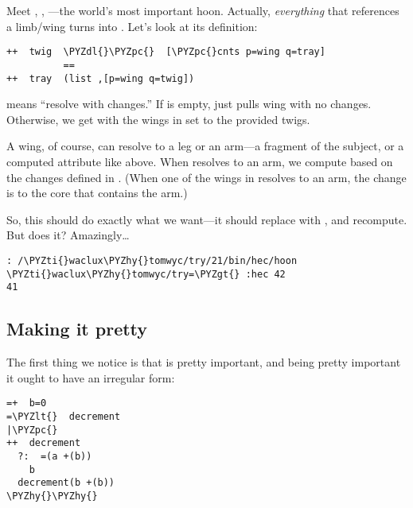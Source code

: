 Meet \kode{\%=}, , ---the world's most important hoon.
Actually, \emph{everything} that references a limb/wing turns into
\kode{\%=}.  Let's look at its definition:

\begin{framed_shaded}
\begin{Verbatim}[fontsize=\relsize{-2.5},fontseries=b,commandchars=\\\{\}]
++  twig  \PYZdl{}\PYZpc{}  [\PYZpc{}cnts p=wing q=tray]
          ==
++  tray  (list ,[p=wing q=twig])
\end{Verbatim}
\end{framed_shaded}
\kode{\%=} means ``resolve with changes.''  If  is empty, \kode{\%=} just 
pulls wing  with no changes.  Otherwise, we get  with the
wings in  set to the provided twigs.

A wing, of course, can resolve to a leg or an arm---a fragment of
the subject, or a computed attribute like  above.
When  resolves to an arm, we compute based on the changes
defined in .  (When one of the wings in  resolves to an
arm, the change is to the core that contains the arm.)

So, this should do exactly what we want---it should replace 
with , and recompute.  But does it?  Amazingly\ldots{}

\begin{framed_shaded}
\begin{Verbatim}[fontsize=\relsize{-2.5},fontseries=b,commandchars=\\\{\}]
: /\PYZti{}waclux\PYZhy{}tomwyc/try/21/bin/hec/hoon
\PYZti{}waclux\PYZhy{}tomwyc/try=\PYZgt{} :hec 42
41
\end{Verbatim}
\end{framed_shaded}

\subsection{Making it pretty}

The first thing we notice is that \kode{\%=} is pretty important, and
being pretty important it ought to have an irregular form:
\begin{framed_shaded}
\begin{Verbatim}[fontsize=\relsize{-2.5},fontseries=b,commandchars=\\\{\}]
=+  b=0
=\PYZlt{}  decrement
|\PYZpc{}
++  decrement
  ?:  =(a +(b))
    b
  decrement(b +(b))
\PYZhy{}\PYZhy{}
\end{Verbatim}
\end{framed_shaded}

